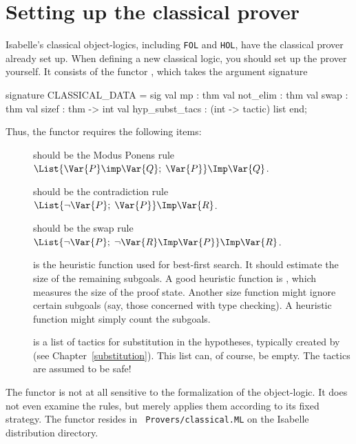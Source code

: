 \section{Setting up the classical prover}
Isabelle's classical object-logics, including {\tt FOL} and {\tt HOL}, have
the classical prover already set up.  When defining a new classical logic,
you should set up the prover yourself.  It consists of the \ML{} functor
, which takes the argument
signature
\begin{ttbox} 
signature CLASSICAL_DATA =
  sig
  val mp             : thm
  val not_elim       : thm
  val swap           : thm
  val sizef          : thm -> int
  val hyp_subst_tacs : (int -> tactic) list
  end;
\end{ttbox}
Thus, the functor requires the following items:
\begin{description}
\item[] should be the Modus Ponens rule
$\List{\Var{P}\imp\Var{Q};\; \Var{P}} \Imp \Var{Q}$.

\item[] should be the contradiction rule
$\List{\neg\Var{P};\; \Var{P}} \Imp \Var{R}$.

\item[] should be the swap rule
$\List{\neg \Var{P}; \; \neg \Var{R}\Imp \Var{P}} \Imp \Var{R}$.

\item[] is the heuristic function used for best-first
search.  It should estimate the size of the remaining subgoals.  A good
heuristic function is , which measures the size of the
proof state.  Another size function might ignore certain subgoals (say,
those concerned with type checking).  A heuristic function might simply
count the subgoals.

\item[] is a list of tactics for substitution in
the hypotheses, typically created by  (see
Chapter~\ref{substitution}).  This list can, of course, be empty.  The
tactics are assumed to be safe!
\end{description}
The functor is not at all sensitive to the formalization of the
object-logic.  It does not even examine the rules, but merely applies them
according to its fixed strategy.  The functor resides in {\tt
Provers/classical.ML} on the Isabelle distribution directory.

